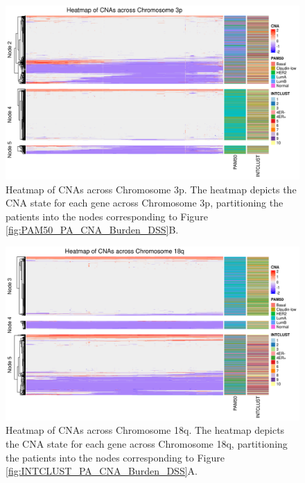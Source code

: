 \begin{figure}[H]
\vspace{0.7cm}
  \centering
  \includegraphics[width=1\textwidth]{../figures/Chapter_3/PA_Ctree_Survival_Burden_DSS_PAM50.png_3p_All_Heatmap.png}
  \caption[Heatmap of CNAs across Chromosome 3p.]{Heatmap of CNAs across Chromosome 3p. The heatmap depicts the CNA state for each gene across Chromosome 3p, partitioning the patients into the nodes corresponding to Figure \ref{fig:PAM50_PA_CNA_Burden_DSS}B.}
  \label{PA_SurvTrees_Burden_Heatmaps_3p}
\end{figure}
\vspace{1cm}
\begin{figure}[H]
  \centering
  \includegraphics[width=1\textwidth]{../figures/Chapter_3/PA_PartyKit_Survival_Burden_DSS_INTCLUST.png_18q_All_Heatmap.png}
  \caption[Heatmap of CNAs across Chromosome 18q.]{Heatmap of CNAs across Chromosome 18q. The heatmap depicts the CNA state for each gene across Chromosome 18q, partitioning the patients into the nodes corresponding to Figure \ref{fig:INTCLUST_PA_CNA_Burden_DSS}A.}
  \label{PA_SurvTrees_Burden_Heatmaps_18q}
\end{figure} 

